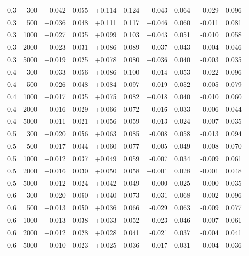 \begin{longtable}{rrrrrrrrrr}
0.3 & 300  & +0.042 & 0.055 & +0.114 & 0.124 & +0.043 & 0.064 & -0.029 & 0.096 \\
0.3 & 500  & +0.036 & 0.048 & +0.111 & 0.117 & +0.046 & 0.060 & -0.011 & 0.081 \\
0.3 & 1000 & +0.027 & 0.035 & +0.099 & 0.103 & +0.043 & 0.051 & -0.010 & 0.058 \\
0.3 & 2000 & +0.023 & 0.031 & +0.086 & 0.089 & +0.037 & 0.043 & -0.004 & 0.046 \\
0.3 & 5000 & +0.019 & 0.025 & +0.078 & 0.080 & +0.036 & 0.040 & -0.003 & 0.035 \\

0.4 & 300  & +0.033 & 0.056 & +0.086 & 0.100 & +0.014 & 0.053 & -0.022 & 0.096 \\
0.4 & 500  & +0.026 & 0.048 & +0.084 & 0.097 & +0.019 & 0.052 & -0.005 & 0.079 \\
0.4 & 1000 & +0.017 & 0.035 & +0.075 & 0.082 & +0.018 & 0.040 & -0.010 & 0.060 \\
0.4 & 2000 & +0.016 & 0.029 & +0.066 & 0.072 & +0.016 & 0.033 & -0.006 & 0.044 \\
0.4 & 5000 & +0.011 & 0.021 & +0.056 & 0.059 & +0.013 & 0.024 & -0.007 & 0.035 \\

0.5 & 300  & +0.020 & 0.056 & +0.063 & 0.085 & -0.008 & 0.058 & -0.013 & 0.094 \\
0.5 & 500  & +0.017 & 0.044 & +0.060 & 0.077 & -0.005 & 0.049 & -0.008 & 0.070 \\
0.5 & 1000 & +0.012 & 0.037 & +0.049 & 0.059 & -0.007 & 0.034 & -0.009 & 0.061 \\
0.5 & 2000 & +0.016 & 0.030 & +0.050 & 0.058 & +0.001 & 0.028 & -0.001 & 0.048 \\
0.5 & 5000 & +0.012 & 0.024 & +0.042 & 0.049 & +0.000 & 0.025 & +0.000 & 0.035 \\

0.6 & 300  & +0.020 & 0.060 & +0.040 & 0.073 & -0.031 & 0.068 & +0.002 & 0.096 \\
0.6 & 500  & +0.013 & 0.050 & +0.036 & 0.066 & -0.029 & 0.063 & -0.009 & 0.077 \\
0.6 & 1000 & +0.013 & 0.038 & +0.033 & 0.052 & -0.023 & 0.046 & +0.007 & 0.061 \\
0.6 & 2000 & +0.012 & 0.028 & +0.028 & 0.041 & -0.021 & 0.037 & -0.004 & 0.041 \\
0.6 & 5000 & +0.010 & 0.023 & +0.025 & 0.036 & -0.017 & 0.031 & +0.004 & 0.036 \\


\end{longtable}
